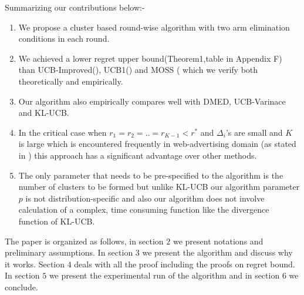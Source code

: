 	Summarizing our contributions below:-
\begin{enumerate}
\item We propose a cluster based round-wise algorithm with two arm elimination conditions in each round.
\item We achieved a lower regret upper bound(Theorem1,table in Appendix F) than UCB-Improved(\cite{auer2010ucb}), UCB1(\cite{auer2002finite}) and  MOSS (\cite{audibert2009minimax} which we verify both theoretically and empirically.
\item Our algorithm also empirically compares well with DMED, UCB-Varinace and KL-UCB.
\item In the critical case when $r_{1}=r_{2}=..=r_{K-1}<r^{*}$ and $\Delta_{i}$'s are small and $K$ is large which is encountered frequently in web-advertising domain (as stated in \cite{garivier2011kl}) this approach has a significant advantage over other methods.
\item The only parameter that needs to be pre-specified to the algorithm is the number of clusters to be formed but unlike KL-UCB our algorithm parameter $p$ is not distribution-specific and also our algorithm does not involve calculation of a complex, time consuming function like the divergence function of KL-UCB.
\end{enumerate}
	
	The paper is organized as follows, in section $2$ we present notations and preliminary assumptions. In section $3$ we present the algorithm and discuss why it works. Section $4$ deals with all the proof including the proofs on regret bound. In section $5$ we present the experimental run of the algorithm and in section $6$ we conclude. 
